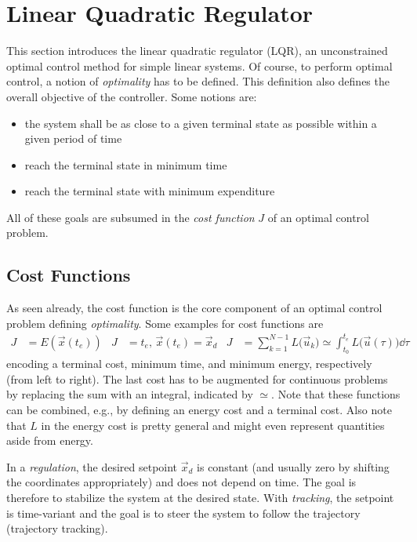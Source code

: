 	\section{Linear Quadratic Regulator}
		This section introduces the linear quadratic regulator (LQR), an unconstrained optimal control method for simple linear systems. Of course, to perform optimal control, a notion of \emph{optimality} has to be defined. This definition also defines the overall objective of the controller. Some notions are:
		\begin{itemize}
			\item {} the system shall be as close to a given terminal state as possible within a given period of time
			\item {} reach the terminal state in minimum time
			\item {} reach the terminal state with minimum expenditure
		\end{itemize}
		All of these goals are subsumed in the \emph{cost function} \(J\) of an optimal control problem.

		\subsection{Cost Functions}
			As seen already, the cost function is the core component of an optimal control problem defining \emph{optimality}. Some examples for cost functions are
			\begin{align}
				J &= E(\vec{x}(t_e)) &
				J &= t_e,\, \vec{x}(t_e) = \vec{x}_d &
				J &= \sum_{k = 1}^{N - 1} L\bigl( \vec{u}_k \bigr) \simeq \int_{t_0}^{t_e}\! L\bigl( \vec{u}(\tau) \bigr) \dd{\tau}
			\end{align}
			encoding a terminal cost, minimum time, and minimum energy, respectively (from left to right). The last cost has to be augmented for continuous problems by replacing the sum with an integral, indicated by \( \simeq \). Note that these functions can be combined, e.g., by defining an energy cost and a terminal cost. Also note that \(L\) in the energy cost is pretty general and might even represent quantities aside from energy.

			In a \emph{regulation}, the desired setpoint \(\vec{x}_d\) is constant (and usually zero by shifting the coordinates appropriately) and does not depend on time. The goal is therefore to stabilize the system at the desired state. With \emph{tracking}, the setpoint is time-variant and the goal is to steer the system to follow the trajectory (trajectory tracking).

